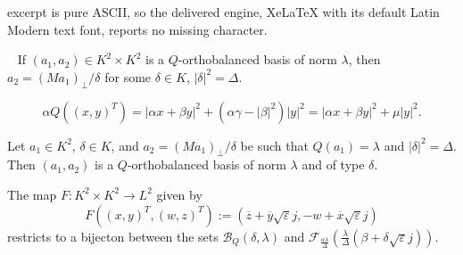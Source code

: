\documentclass[10pt,a4paper]{amsart}
\begin{document}
excerpt is pure ASCII, so the delivered engine, XeLaTeX with its default Latin Modern text font, reports no missing character.
\begin{proposition}\label{perpprop2}~
If $(a_1,a_2)\in K^2\times K^2$ is a
$Q$-orthobalanced basis of norm $\lambda$, then $a_2=(Ma_1)_\perp/\delta$ for some $\delta\in K$, $|\delta|^2=\Delta$.
\end{proposition}

\begin{equation}\label{Qsquare}
\alpha Q((x,y)^T)=|\alpha x+\beta y|^2+(\alpha\gamma-|\beta|^2)|y|^2=|\alpha x+\beta y|^2+\mu|y|^2.
\end{equation}

\begin{lemma}\label{perpconverse}
Let $a_1\in K^2$, $\delta\in K$, and $a_2=(Ma_1)_\perp/\delta$ be such that $Q(a_1)=\lambda$ and $|\delta|^2=\Delta$. Then $(a_1,a_2)$ is a $Q$-orthobalanced basis of norm $\lambda$ and of type $\delta$.
\end{lemma}

\begin{proposition}\label{factorizationthm}
The map $F:K^2\times K^2\to L^2$ given by
\[
F((x,y)^T,(w,z)^T):=\left(\overline z+\overline y\sqrt{\varepsilon}j,-w+\overline x\sqrt{\varepsilon}j\right)
\]
restricts to a bijecton between the sets $\mathcal B_Q(\delta,\lambda)$ and $\mathcal F_{\frac{\alpha\lambda}{\Delta}}\left(\frac{\lambda}{\Delta}(\beta+\delta\sqrt{\varepsilon}j)\right)$.
\end{proposition}
\end{document}
